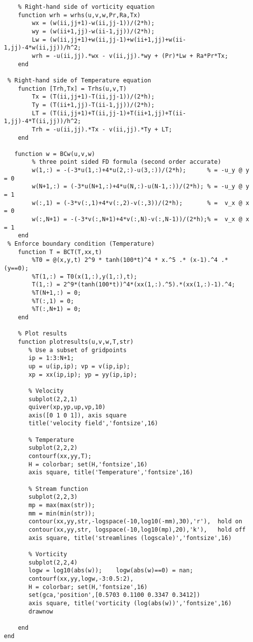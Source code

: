 \begin{verbatim}
    % Right-hand side of vorticity equation
    function wrh = wrhs(u,v,w,Pr,Ra,Tx)
        wx = (w(ii,jj+1)-w(ii,jj-1))/(2*h);
        wy = (w(ii+1,jj)-w(ii-1,jj))/(2*h);
        Lw = (w(ii,jj+1)+w(ii,jj-1)+w(ii+1,jj)+w(ii-1,jj)-4*w(ii,jj))/h^2;
        wrh = -u(ii,jj).*wx - v(ii,jj).*wy + (Pr)*Lw + Ra*Pr*Tx;
    end

 % Right-hand side of Temperature equation
    function [Trh,Tx] = Trhs(u,v,T)
        Tx = (T(ii,jj+1)-T(ii,jj-1))/(2*h);
        Ty = (T(ii+1,jj)-T(ii-1,jj))/(2*h);
        LT = (T(ii,jj+1)+T(ii,jj-1)+T(ii+1,jj)+T(ii-1,jj)-4*T(ii,jj))/h^2;
        Trh = -u(ii,jj).*Tx - v(ii,jj).*Ty + LT;
    end

   function w = BCw(u,v,w)
        % three point sided FD formula (second order accurate)
        w(1,:) = -(-3*u(1,:)+4*u(2,:)-u(3,:))/(2*h);      % = -u_y @ y = 0
        w(N+1,:) = (-3*u(N+1,:)+4*u(N,:)-u(N-1,:))/(2*h); % = -u_y @ y = 1
        w(:,1) = (-3*v(:,1)+4*v(:,2)-v(:,3))/(2*h);       % =  v_x @ x = 0
        w(:,N+1) = -(-3*v(:,N+1)+4*v(:,N)-v(:,N-1))/(2*h);% =  v_x @ x = 1
    end
 % Enforce boundary condition (Temperature)
    function T = BCT(T,xx,t)
        %T0 = @(x,y,t) 2^9 * tanh(100*t)^4 * x.^5 .* (x-1).^4 .* (y==0);
        %T(1,:) = T0(x(1,:),y(1,:),t);
        T(1,:) = 2^9*(tanh(100*t))^4*(xx(1,:).^5).*(xx(1,:)-1).^4;
        %T(N+1,:) = 0;
        %T(:,1) = 0;
        %T(:,N+1) = 0;
    end

    % Plot results
    function plotresults(u,v,w,T,str)
       % Use a subset of gridpoints
       ip = 1:3:N+1;
       up = u(ip,ip); vp = v(ip,ip);
       xp = xx(ip,ip); yp = yy(ip,ip);

       % Velocity
       subplot(2,2,1)
       quiver(xp,yp,up,vp,10)
       axis([0 1 0 1]), axis square
       title('velocity field','fontsize',16)

       % Temperature
       subplot(2,2,2)
       contourf(xx,yy,T);
       H = colorbar; set(H,'fontsize',16)
       axis square, title('Temperature','fontsize',16)

       % Stream function
       subplot(2,2,3)
       mp = max(max(str));
       mm = min(min(str));
       contour(xx,yy,str,-logspace(-10,log10(-mm),30),'r'),  hold on
       contour(xx,yy,str, logspace(-10,log10(mp),20),'k'),   hold off
       axis square, title('streamlines (logscale)','fontsize',16)

       % Vorticity
       subplot(2,2,4)
       logw = log10(abs(w));    logw(abs(w)==0) = nan;
       contourf(xx,yy,logw,-3:0.5:2),
       H = colorbar; set(H,'fontsize',16)
       set(gca,'position',[0.5703 0.1100 0.3347 0.3412])
       axis square, title('vorticity (log(abs(w))','fontsize',16)
       drawnow

    end
end
\end{verbatim}
